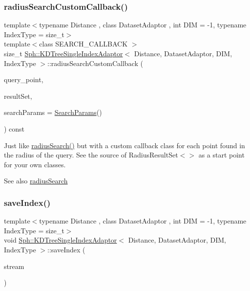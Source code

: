 \subsubsection{\texorpdfstring{radius\+Search\+Custom\+Callback()}{radiusSearchCustomCallback()}}
{\footnotesize\ttfamily template$<$typename Distance , class Dataset\+Adaptor , int D\+IM = -\/1, typename Index\+Type  = size\+\_\+t$>$ \\
template$<$class S\+E\+A\+R\+C\+H\+\_\+\+C\+A\+L\+L\+B\+A\+CK $>$ \\
size\+\_\+t \hyperlink{classSph_1_1KDTreeSingleIndexAdaptor}{Sph\+::\+K\+D\+Tree\+Single\+Index\+Adaptor}$<$ Distance, Dataset\+Adaptor, D\+IM, Index\+Type $>$\+::radius\+Search\+Custom\+Callback (\begin{DoxyParamCaption}\item[{const \hyperlink{classBasicVector}{Vector} \&}]{query\+\_\+point,  }\item[{S\+E\+A\+R\+C\+H\+\_\+\+C\+A\+L\+L\+B\+A\+CK \&}]{result\+Set,  }\item[{const \hyperlink{structSph_1_1SearchParams}{Search\+Params} \&}]{search\+Params = {\ttfamily \hyperlink{structSph_1_1SearchParams}{Search\+Params}()} }\end{DoxyParamCaption}) const\hspace{0.3cm}{\ttfamily [inline]}}

Just like \hyperlink{classSph_1_1KDTreeSingleIndexAdaptor_a1b00ad9bd5a4e2e265011ad4d2265e03}{radius\+Search()} but with a custom callback class for each point found in the radius of the query. See the source of Radius\+Result\+Set$<$$>$ as a start point for your own classes. \begin{DoxySeeAlso}{See also}
\hyperlink{classSph_1_1KDTreeSingleIndexAdaptor_a1b00ad9bd5a4e2e265011ad4d2265e03}{radius\+Search} 
\end{DoxySeeAlso}
\hypertarget{classSph_1_1KDTreeSingleIndexAdaptor_adb51e3a0ffcdaf32a9153e82339070c1}{}\label{classSph_1_1KDTreeSingleIndexAdaptor_adb51e3a0ffcdaf32a9153e82339070c1} 
\subsubsection{\texorpdfstring{save\+Index()}{saveIndex()}}
{\footnotesize\ttfamily template$<$typename Distance , class Dataset\+Adaptor , int D\+IM = -\/1, typename Index\+Type  = size\+\_\+t$>$ \\
void \hyperlink{classSph_1_1KDTreeSingleIndexAdaptor}{Sph\+::\+K\+D\+Tree\+Single\+Index\+Adaptor}$<$ Distance, Dataset\+Adaptor, D\+IM, Index\+Type $>$\+::save\+Index (\begin{DoxyParamCaption}\item[{F\+I\+LE $\ast$}]{stream }\end{DoxyParamCaption})\hspace{0.3cm}{\ttfamily [inline]}}

